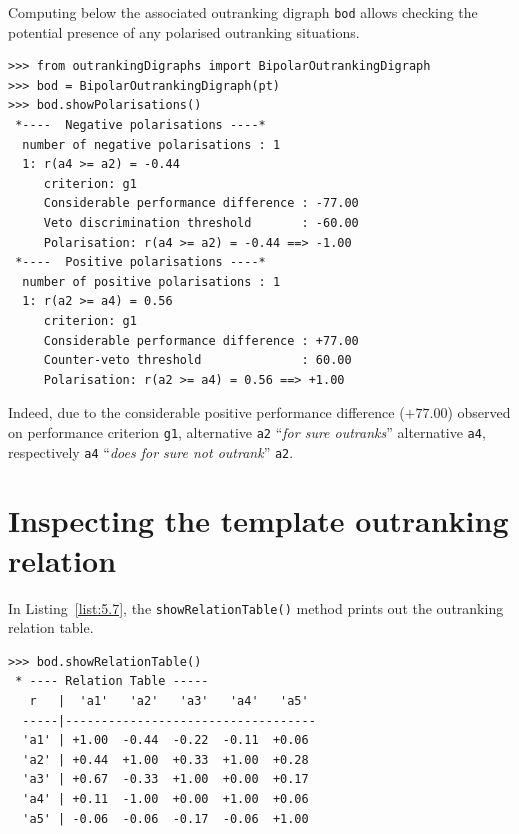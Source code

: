Computing below the associated outranking digraph \texttt{bod} allows checking the potential presence of any polarised outranking situations.
\begin{lstlisting}
>>> from outrankingDigraphs import BipolarOutrankingDigraph
>>> bod = BipolarOutrankingDigraph(pt)
>>> bod.showPolarisations()
 *----  Negative polarisations ----*
  number of negative polarisations : 1 
  1: r(a4 >= a2) = -0.44
     criterion: g1
     Considerable performance difference : -77.00
     Veto discrimination threshold       : -60.00
     Polarisation: r(a4 >= a2) = -0.44 ==> -1.00
 *----  Positive polarisations ----*
  number of positive polarisations : 1 
  1: r(a2 >= a4) = 0.56
     criterion: g1
     Considerable performance difference : +77.00
     Counter-veto threshold              : 60.00
     Polarisation: r(a2 >= a4) = 0.56 ==> +1.00
\end{lstlisting}

Indeed, due to the considerable positive performance difference ($+77.00$) observed on performance criterion \texttt{g1}, alternative \texttt{a2} ``\emph{for sure outranks}'' alternative \texttt{a4}, respectively \texttt{a4} ``\emph{does for sure not outrank}'' \texttt{a2}.

\section{Inspecting the template outranking relation}
\label{sec:5.6}

In Listing~\vref{list:5.7}, the \texttt{showRelationTable()} method prints out the outranking relation table.
\begin{lstlisting}[caption={The template outranking relation},label=list:5.7]
>>> bod.showRelationTable()
 * ---- Relation Table -----
   r   |  'a1'   'a2'   'a3'   'a4'   'a5'   
  -----|-----------------------------------
  'a1' | +1.00  -0.44  -0.22  -0.11  +0.06  
  'a2' | +0.44  +1.00  +0.33  +1.00  +0.28  
  'a3' | +0.67  -0.33  +1.00  +0.00  +0.17  
  'a4' | +0.11  -1.00  +0.00  +1.00  +0.06  
  'a5' | -0.06  -0.06  -0.17  -0.06  +1.00
\end{lstlisting}

